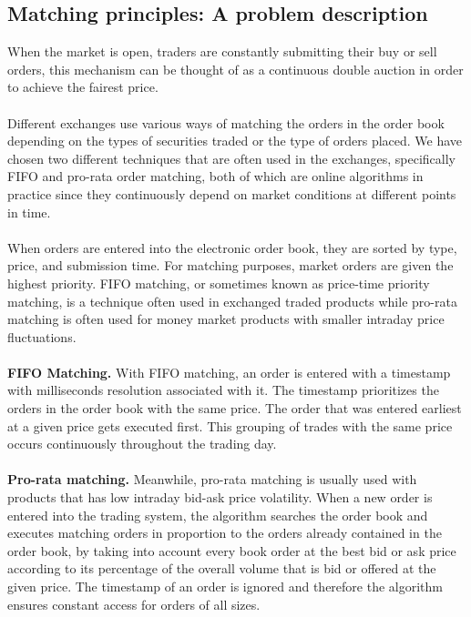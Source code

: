 \documentclass{article}
\begin{document}
\subsection{Matching principles: A problem description}
When the market is open, traders are constantly submitting their buy or sell orders, this mechanism can be thought of as a continuous double auction in order to achieve the fairest price.\\\\
Different exchanges use various ways of matching the orders in the order book depending on the types of securities traded or the type of orders placed. We have chosen two different techniques that are often used in the exchanges, specifically FIFO and pro-rata order matching, both of which are online algorithms in practice since they continuously depend on market conditions at different points in time.\\\\
When orders are entered into the electronic order book, they are sorted by type, price, and submission time. For matching purposes, market orders are given the highest priority. FIFO matching, or sometimes known as price-time priority matching, is a technique often used in exchanged traded products while pro-rata matching is often used for money market products with smaller intraday price fluctuations.\\\\
\textbf{FIFO Matching. } With FIFO matching, an order is entered with a timestamp with milliseconds resolution associated with it. The timestamp prioritizes the orders in the order book with the same price. The order that was entered earliest at a given price gets executed first. This grouping of trades with the same price occurs continuously throughout the trading day.\\\\
\textbf{Pro-rata matching. } Meanwhile, pro-rata matching is usually used with products that has low intraday bid-ask price volatility. When a new order is entered into the trading system, the algorithm searches the order book and executes matching orders in proportion to the orders already contained in the order book, by taking into account every book order at the best bid or ask price according to its percentage of the overall volume that is bid or offered at the given price. The timestamp of an order is ignored and therefore the algorithm ensures constant access for orders of all sizes.\\\\
\end{document}
